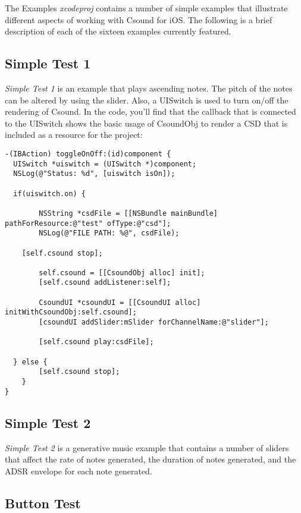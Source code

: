 \documentclass[11pt]{article}
\begin{document}
The Examples \textit{xcodeproj} contains a number of simple examples that illustrate different aspects of working with Csound for iOS.  The following is a brief description of each of the sixteen examples currently featured.

\subsection{Simple Test 1}

\emph{Simple Test 1} is an example that plays ascending notes.  The pitch of the notes can be altered by using the slider.  Also, a UISwitch is used to turn on/off the rendering of Csound.  In the code, you'll find that the callback that is connected to the UISwitch shows the basic usage of CsoundObj to render a CSD that is included as a resource for the project:

\begin{lstlisting}[caption=Example code showing configuring and starting a CsoundObj]
-(IBAction) toggleOnOff:(id)component {
  UISwitch *uiswitch = (UISwitch *)component;
  NSLog(@"Status: %d", [uiswitch isOn]);

  if(uiswitch.on) {

        NSString *csdFile = [[NSBundle mainBundle] pathForResource:@"test" ofType:@"csd"];
        NSLog(@"FILE PATH: %@", csdFile);

    [self.csound stop];

        self.csound = [[CsoundObj alloc] init];
        [self.csound addListener:self];

        CsoundUI *csoundUI = [[CsoundUI alloc] initWithCsoundObj:self.csound];
        [csoundUI addSlider:mSlider forChannelName:@"slider"];

        [self.csound play:csdFile];

  } else {
        [self.csound stop];
    }
}

\end{lstlisting}

\subsection{Simple Test 2}


\emph{Simple Test 2} is a generative music example that contains a number of sliders that affect the rate of notes generated, the duration of notes generated, and the ADSR envelope for each note generated.


\subsection{Button Test}
\end{document}
